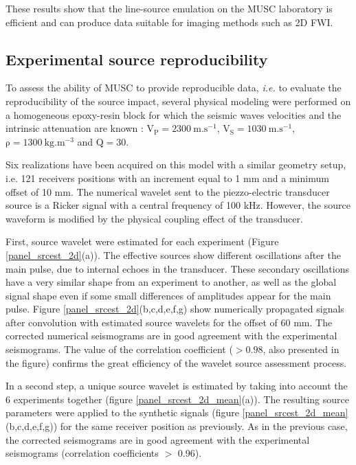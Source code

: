 \documentclass[manuscript,revised]{geophysics}
\begin{document}
\noindent These results show that the line-source emulation on the MUSC laboratory is efficient and can produce data suitable for imaging methods such as 2D FWI.


\subsection{Experimental source reproducibility}

\noindent To assess the ability of MUSC to provide reproducible data, \textit{i.e.} to evaluate the reproducibility of the source impact, several physical modeling were performed on a homogeneous epoxy-resin block for which the seismic waves velocities and the intrinsic attenuation are known : $\mathrm{V_{P}=2300\ m.s^{-1}}$, $\mathrm{V_{S}=1030\ m.s^{-1}}$, $\mathrm{\rho=1300\ kg.m^{-3}}$ and $\mathrm{Q=30}$. 

\noindent Six realizations have been acquired on this model with a similar geometry setup, i.e. 121 receivers positions with an increment equal to 1 mm and a minimum offset of 10 mm. The numerical wavelet sent to the piezzo-electric transducer source is a Ricker signal with a central frequency of 100 kHz. However, the source waveform is modified by the physical coupling effect of the transducer. 

\noindent First, source wavelet were estimated for each experiment (Figure \ref{panel_srcest_2d}(a)). The effective sources show different oscillations after the main pulse, due to internal echoes in the transducer. These secondary oscillations have a very similar shape from an experiment to another, as well as the global signal shape even if some small differences of amplitudes appear for the main pulse. Figure \ref{panel_srcest_2d}(b,c,d,e,f,g) show numerically propagated signals after convolution with estimated source wavelets for the offset of 60 mm. The corrected numerical seismograms are in good agreement with the experimental seismograms. The value of the correlation coefficient ($> 0.98$, also presented in the figure) confirms the great efficiency of the wavelet source assessment process.

\noindent In a second step, a unique source wavelet is estimated by taking into account the 6 experiments together (figure \ref{panel_srcest_2d_mean}(a)). The resulting source parameters were applied to the synthetic signals (figure \ref{panel_srcest_2d_mean}(b,c,d,e,f,g)) for the same receiver position as previously. As in the previous case, the corrected seismograms are in good agreement with the experimental seismograms (correlation coefficients $\mathrm{>}$ 0.96).  
\end{document}
